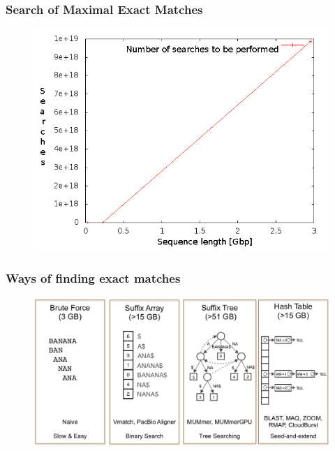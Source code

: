 \documentclass{beamer}
\begin{document}
\begin{frame}
\frametitle{Search of Maximal Exact Matches}
\begin{figure}\includegraphics[scale=0.4]{search.png}\end{figure}
\end{frame}
\begin{frame}
 \frametitle{Ways of finding exact matches}
\begin{figure}\includegraphics[scale=0.39]{state.png}\end{figure}
\end{frame}
\end{document}
